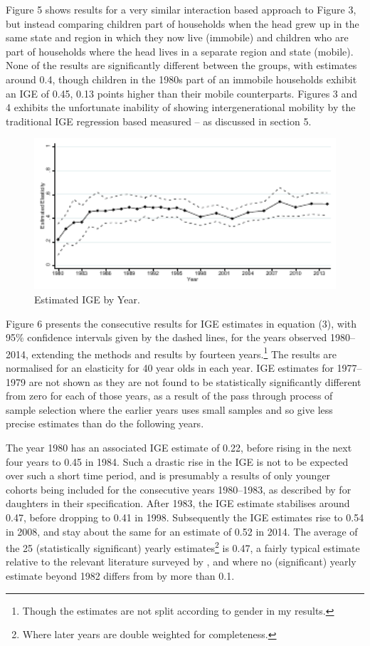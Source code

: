 \documentclass[notitlepage,12pt]{article}
\begin{document}
Figure 5 shows results for a very similar interaction based approach to Figure 3, but instead comparing children part of households when the head grew up in the same state and region in which they now live (immobile) and children who are part of households where the head lives in a separate region and state (mobile).  None of the results are significantly different between the groups, with estimates around 0.4, though children in the 1980s part of an immobile households exhibit an IGE of 0.45, 0.13 points higher than their mobile counterparts.  Figures 3 and 4 exhibits the unfortunate inability of showing intergenerational mobility by the traditional IGE regression based measured – as discussed in section 5.

\begin{figure}
  \centering
  \caption{Estimated IGE by Year.}
  \includegraphics[width=6in]{Graph5.pdf}
\end{figure}
Figure 6 presents the consecutive results for IGE estimates in equation (3), with 95\% confidence intervals given by the dashed lines, for the years observed 1980--2014, extending the methods and results by \cite{lee2009trends} fourteen years.\footnote{Though the estimates are not split according to gender in my results.}  The results are normalised for an elasticity for 40 year olds in each year.   IGE estimates for 1977--1979 are not shown as they are not found to be statistically significantly different from zero for each of those years, as a result of the pass through process of sample selection where the earlier years uses small samples and so give less precise estimates than do the following years.  

The year 1980 has an associated IGE estimate of 0.22, before rising in the next four years to 0.45 in 1984.  Such a drastic rise in the IGE is not to be expected over such a short time period, and is presumably a results of only younger cohorts being included for the consecutive years 1980--1983, as described by \cite{lee2009trends} for daughters in their specification.  After 1983, the IGE estimate stabilises around 0.47, before dropping to 0.41 in 1998.  Subsequently the IGE estimates rise to 0.54 in 2008, and stay about the same for an estimate of 0.52 in 2014.  The average of the 25 (statistically significant) yearly estimates\footnote{Where later years are double weighted for completeness.}  is 0.47, a fairly typical estimate relative to the relevant literature surveyed by \cite{solon1992intergenerational}, and where no (significant) yearly estimate beyond 1982 differs from by more than 0.1.
\end{document}
